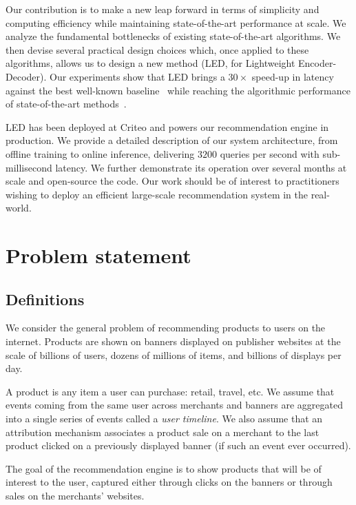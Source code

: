 \documentclass[sigconf]{acmart}
\begin{document}
Our contribution is to make a new leap forward in terms of simplicity and computing efficiency while maintaining state-of-the-art performance at scale. We analyze the fundamental bottlenecks of existing state-of-the-art algorithms. We then devise several practical design choices which, once applied to these algorithms, allows us to design a new method (LED, for Lightweight Encoder-Decoder). Our experiments show that LED brings a $30\times$ speed-up in latency against the best well-known baseline~\cite{pixie-pinterest-www-2018} while reaching the algorithmic performance of state-of-the-art methods~\cite{variational-liang-2018}.

LED has been deployed at Criteo and powers our recommendation engine in production. We provide a detailed description of our system architecture, from offline training to online inference, delivering $3200$ queries per second with sub-millisecond latency. We further demonstrate its operation over several months at scale and open-source the code. Our work should  be of interest to practitioners wishing to deploy an efficient large-scale recommendation system in the real-world.

\section{Problem statement}

\subsection{Definitions}

We consider the general problem of recommending products to users on the internet. Products are shown on banners displayed on publisher websites at the scale of billions of users, dozens of millions of items, and billions of displays per day. 



A product is any item a user can purchase: retail, travel, etc. We assume that events coming from the same user across merchants and banners are aggregated into a single series of events called a {\it user timeline}. We also assume that an attribution mechanism associates a product sale on a merchant to the last product clicked on a previously displayed banner (if such an event ever occurred).

The goal of the recommendation engine is to show products that will be of interest to the user, captured either through clicks on the banners or through sales on the merchants' websites. 
 
\end{document}
